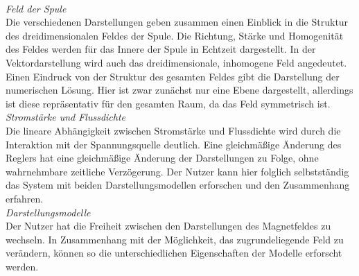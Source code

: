 \vspace{8px}
\begin{center}
	\\
\end{center}
\vspace{6px}

\textit{Feld der Spule}\\
Die verschiedenen Darstellungen geben zusammen einen Einblick in die Struktur des dreidimensionalen Feldes der Spule. Die Richtung, Stärke und Homogenität des Feldes werden für das Innere der Spule in Echtzeit dargestellt. In der Vektordarstellung wird auch das dreidimensionale, inhomogene Feld angedeutet. Einen Eindruck von der Struktur des gesamten Feldes gibt die Darstellung der numerischen Lösung. Hier ist zwar zunächst nur eine Ebene dargestellt, allerdings ist diese repräsentativ für den gesamten Raum, da das Feld symmetrisch ist.\\

\textit{Stromstärke und Flussdichte}\\
Die lineare Abhängigkeit zwischen Stromstärke und Flussdichte wird durch die Interaktion mit der Spannungsquelle deutlich. Eine gleichmäßige Änderung des Reglers hat eine gleichmäßige Änderung der Darstellungen zu Folge, ohne wahrnehmbare zeitliche Verzögerung. Der Nutzer kann hier folglich selbstständig das System mit beiden Darstellungsmodellen erforschen und den Zusammenhang erfahren.\\

\textit{Darstellungsmodelle}\\
Der Nutzer hat die Freiheit zwischen den Darstellungen des Magnetfeldes zu wechseln. In Zusammenhang mit der Möglichkeit, das zugrundeliegende Feld zu verändern, können so die unterschiedlichen Eigenschaften der Modelle erforscht werden.\\

